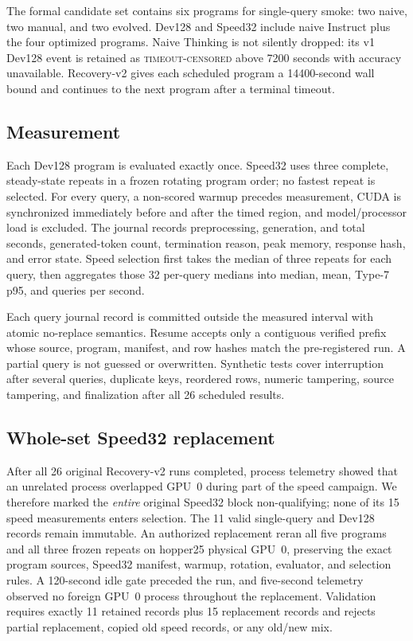 \documentclass{article}
\begin{document}
The formal candidate set contains six programs for single-query smoke:
two naive, two manual, and two evolved. Dev128 and Speed32 include naive Instruct
plus the four optimized programs. Naive Thinking is not silently dropped: its
v1 Dev128 event is retained as \textsc{timeout-censored} above 7200 seconds with
accuracy unavailable. Recovery-v2 gives each scheduled program a 14400-second
wall bound and continues to the next program after a terminal timeout.

\subsection{Measurement}
Each Dev128 program is evaluated exactly once. Speed32 uses three complete,
steady-state repeats in a frozen rotating program order; no fastest repeat is
selected. For every query, a non-scored warmup precedes measurement, CUDA is
synchronized immediately before and after the timed region, and model/processor
load is excluded. The journal records preprocessing, generation, and total
seconds, generated-token count, termination reason, peak memory, response hash,
and error state. Speed selection first takes the median of three repeats for each
query, then aggregates those 32 per-query medians into median, mean, Type-7 p95,
and queries per second.

Each query journal record is committed outside the measured interval with atomic
no-replace semantics. Resume accepts only a contiguous verified prefix whose
source, program, manifest, and row hashes match the pre-registered run. A partial
query is not guessed or overwritten. Synthetic tests cover interruption after
several queries, duplicate keys, reordered rows, numeric tampering, source
tampering, and finalization after all 26 scheduled results.

\subsection{Whole-set Speed32 replacement}
After all 26 original Recovery-v2 runs completed, process telemetry showed that an
unrelated process overlapped GPU~0 during part of the speed campaign. We therefore
marked the \emph{entire} original Speed32 block non-qualifying; none of its 15
speed measurements enters selection. The 11 valid single-query and Dev128 records
remain immutable. An authorized replacement reran all five programs and all three
frozen repeats on hopper25 physical GPU~0, preserving the exact program sources,
Speed32 manifest, warmup, rotation, evaluator, and selection rules. A 120-second
idle gate preceded the run, and five-second telemetry observed no foreign GPU~0
process throughout the replacement. Validation requires exactly 11 retained
records plus 15 replacement records and rejects partial replacement, copied old
speed records, or any old/new mix.
\end{document}
